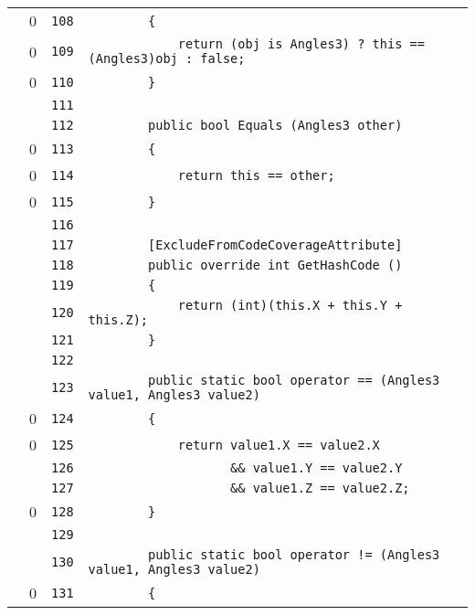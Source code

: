 \documentclass[a4paper,10pt]{article}
\begin{document}
\begin{longtable}[l]{lrrl}
\cellcolor{red} & 0 & \verb~108~ & \verb~        {~\\
\cellcolor{red} & 0 & \verb~109~ & \verb~            return (obj is Angles3) ? this == (Angles3)obj : false;~\\
\cellcolor{red} & 0 & \verb~110~ & \verb~        }~\\
\cellcolor{gray} &  & \verb~111~ & \verb~~\\
\cellcolor{gray} &  & \verb~112~ & \verb~        public bool Equals (Angles3 other)~\\
\cellcolor{red} & 0 & \verb~113~ & \verb~        {~\\
\cellcolor{red} & 0 & \verb~114~ & \verb~            return this == other;~\\
\cellcolor{red} & 0 & \verb~115~ & \verb~        }~\\
\cellcolor{gray} &  & \verb~116~ & \verb~~\\
\cellcolor{gray} &  & \verb~117~ & \verb~        [ExcludeFromCodeCoverageAttribute]~\\
\cellcolor{gray} &  & \verb~118~ & \verb~        public override int GetHashCode ()~\\
\cellcolor{gray} &  & \verb~119~ & \verb~        {~\\
\cellcolor{gray} &  & \verb~120~ & \verb~            return (int)(this.X + this.Y + this.Z);~\\
\cellcolor{gray} &  & \verb~121~ & \verb~        }~\\
\cellcolor{gray} &  & \verb~122~ & \verb~~\\
\cellcolor{gray} &  & \verb~123~ & \verb~        public static bool operator == (Angles3 value1, Angles3 value2)~\\
\cellcolor{red} & 0 & \verb~124~ & \verb~        {~\\
\cellcolor{red} & 0 & \verb~125~ & \verb~            return value1.X == value2.X~\\
\cellcolor{gray} &  & \verb~126~ & \verb~                   && value1.Y == value2.Y~\\
\cellcolor{gray} &  & \verb~127~ & \verb~                   && value1.Z == value2.Z;~\\
\cellcolor{red} & 0 & \verb~128~ & \verb~        }~\\
\cellcolor{gray} &  & \verb~129~ & \verb~~\\
\cellcolor{gray} &  & \verb~130~ & \verb~        public static bool operator != (Angles3 value1, Angles3 value2)~\\
\cellcolor{red} & 0 & \verb~131~ & \verb~        {~\\

\end{longtable}
\end{document}
